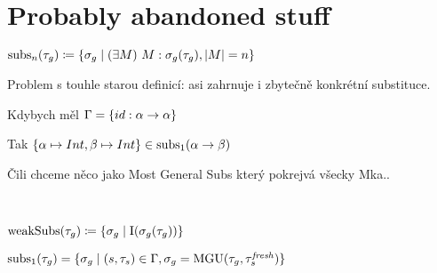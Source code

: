 \documentclass[a4paper,oneside]{memoir}
\begin{document}
~

~

\section{Probably abandoned stuff}

\newcommand{\subs}[2]{\op{subs}_{#2}(#1)}

\begin{preDefinition}
$ \subs{\tau_g}{n} \defi \{ \sigma_g \mid \E{M}{M : \sigma_g(\tau_g)}, \abs{M} = n \}$
\end{preDefinition}

Problem s touhle starou definicí: asi zahrnuje i zbytečně konkrétní substituce.

Kdybych měl $\Gamma = \{id : \alpha \rightarrow \alpha \}$

Tak $\{\alpha \mapsto Int, \beta \mapsto  Int\} \in \subs{\alpha \ar \beta}{1}$

Čili chceme něco jako Most General Subs který pokrejvá všecky Mka.. 



~










$ \operatorname{weakSubs}(\tau_g) \coloneqq \{ \sigma_g \mid \operatorname{I}(\sigma_g(\tau_g)) \}$


\begin{preLemma} 
$ \subs{\tau_g}{1} = \{ \sigma_g \mid (s,\tau_s) \in \Gamma, \sigma_g = \MGU{\tau_g}{\tau^\mathit{fresh}_s}  \} $
\end{preLemma} 


























\backmatter
\end{document}
